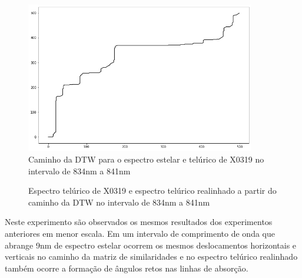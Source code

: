 \begin{figure}[htb]
\centering
\includegraphics[width=10cm]{figuras/x0319_warp_path_zoom.png}
\caption{Caminho da DTW para o espectro estelar e telúrico de X0319 no intervalo de 834nm a 841nm}
\label{fig:x0319-warp-path-zoom}
\end{figure}

\begin{figure}[H]
  \centering
  \hfill
  \caption{Espectro telúrico de X0319 e espectro telúrico realinhado a partir do caminho da DTW no intervalo de 834nm a 841nm}
  \label{fig:x0319-realigned-telluric-zoom}
\end{figure}

Neste experimento são observados os mesmos resultados dos experimentos anteriores em menor escala. Em um intervalo de comprimento de onda que abrange 9nm de espectro estelar ocorrem os mesmos deslocamentos horizontais e verticais no caminho da matriz de similaridades e no espectro telúrico realinhado também ocorre a formação de ângulos retos nas linhas de absorção.


